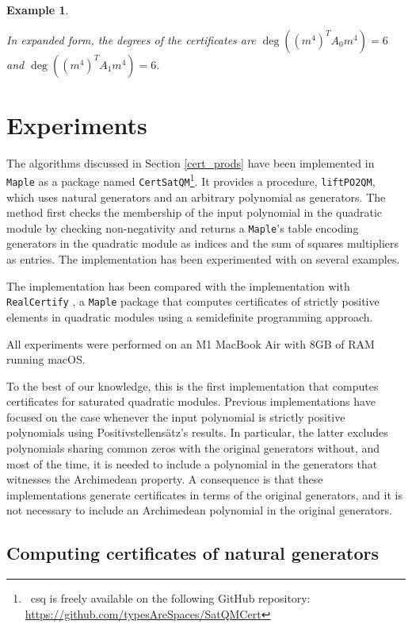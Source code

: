 \documentclass[preprint,12pt,authoryear]{elsarticle}
\newtheorem{example}[theorem]{Example}
\newenvironment{example1}
  {\begin{example}\rm}
  {\end{example}}
\newcommand{\maple}{\texttt{Maple}\xspace}
\newcommand{\lpq}{\texttt{liftPO2QM}\xspace}
\newcommand{\rc}{\texttt{RealCertify}\xspace}
\newcommand{\csq}{\texttt{CertSatQM}\xspace}
\begin{document}
\begin{example1}
\begin{itemize}
    In expanded form, the degrees of the certificates are $\deg((m^{4})^{T} A_0
    m^{4}) = 6$ and $\deg((m^{4})^{T} A_1 m^{4}) = 6$.

  \end{itemize}
\end{example1}

 
 \section{Experiments} \label{experiments}

The algorithms discussed in Section \ref{cert_prods} have been implemented in \maple
as a package named \csq \footnote{\ csq is freely available on the following
  GitHub repository: \url{https://github.com/typesAreSpaces/SatQMCert}}. It
provides a procedure, \lpq, which uses natural generators and an arbitrary
polynomial as generators. The method first checks the membership of the input
polynomial in the quadratic module by checking non-negativity and returns a
\maple's table encoding generators in the quadratic module as indices and the
sum of squares multipliers as entries.
The implementation has been experimented with on several examples. 

The implementation has been compared with the implementation with \rc
\cite{10.1145/3282678.3282681}, a \maple package that computes
certificates of strictly positive elements in quadratic modules using a
semidefinite programming approach.

All experiments were performed on an M1 MacBook Air with 8GB of RAM running
macOS.

To the best of our knowledge, this is the first implementation that computes
certificates for saturated quadratic modules. Previous implementations have
focused on the case whenever the input polynomial is strictly positive
polynomials using Positivstellens\"atz's results. In particular, the latter
excludes polynomials sharing common zeros with the original generators without,
and most of the time, it is needed to include a polynomial in the generators
that witnesses the Archimedean property. A consequence is that these
implementations generate certificates in terms of the original generators, and
it is not necessary to include an Archimedean polynomial in the original
generators.

\subsection{Computing certificates of natural generators}
\end{document}

